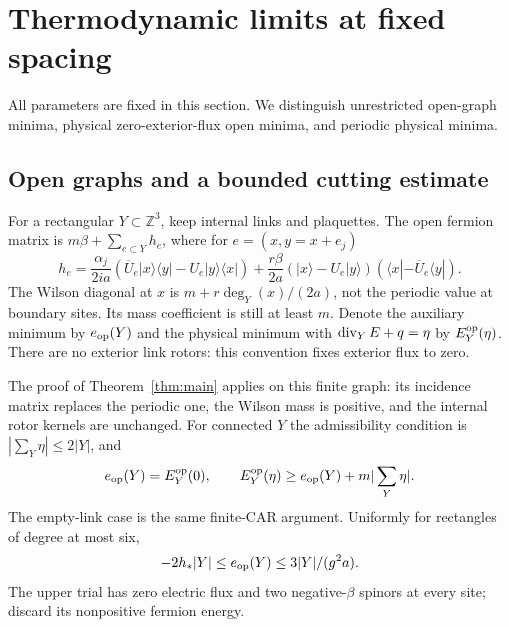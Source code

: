 \section{Thermodynamic limits at fixed spacing}
\label{sec:thermo}

All parameters are fixed in this section. We distinguish
unrestricted open-graph minima, physical zero-exterior-flux
open minima, and periodic physical minima.

\subsection{Open graphs and a bounded cutting estimate}

For a rectangular $Y\subset\mathbb Z^3$, keep internal links and
plaquettes. The open fermion matrix is $m\beta+\sum_{e\subset Y}h_e$,
where for $e=(x,y=x+e_j)$
\begin{equation}
 h_e=\frac{\alpha_j}{2ia}
 (\overline U_e|x\rangle\langle y|-U_e|y\rangle\langle x|)
 +\frac{r\beta}{2a}
 (|x\rangle-U_e|y\rangle)(\langle x|-\overline U_e\langle y|).
 \label{eq:open-edge}
\end{equation}
The Wilson diagonal at $x$ is $m+r\deg_Y(x)/(2a)$,
not the periodic value at boundary sites. Its mass coefficient
is still at least $m$. Denote the auxiliary minimum by
$e_{\rm op}(Y)$ and the physical minimum with
$\operatorname{div}_YE+q=\eta$ by $E_Y^{\rm op}(\eta)$.
There are no exterior link rotors: this convention fixes exterior
flux to zero.

The proof of Theorem~\ref{thm:main} applies on this finite graph:
its incidence matrix replaces the periodic one, the Wilson mass
is positive, and the internal rotor kernels are unchanged.
For connected $Y$ the admissibility condition is
$|\sum_Y\eta|\le2|Y|$, and
\begin{equation}
 e_{\rm op}(Y)=E_Y^{\rm op}(0),\qquad
 E_Y^{\rm op}(\eta)\ge e_{\rm op}(Y)+m|\sum_Y\eta|.
 \label{eq:open-comparison}
\end{equation}
The empty-link case is the same finite-CAR argument.
Uniformly for rectangles of degree at most six,
\begin{equation}
 -2h_*|Y|\le e_{\rm op}(Y)\le3|Y|/(g^2a).
 \label{eq:open-extensive}
\end{equation}
The upper trial has zero electric flux and two negative-$\beta$
spinors at every site; discard its nonpositive fermion energy.

